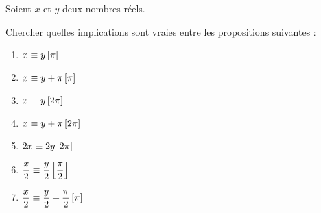 \begin{exo}
Soient \(x\) et \(y\) deux nombres réels.

Chercher quelles implications sont vraies entre les propositions suivantes :

\begin{enumerate}
\item \(x\equiv y\left[\pi\right]\) \\

\item \(x\equiv y+\pi\left[\pi\right]\) \\

\item \(x\equiv y\left[2\pi\right]\) \\

\item \(x\equiv y+\pi\left[2\pi\right]\) \\

\item \(2x\equiv 2y\left[2\pi\right]\) \\

\item \(\dfrac{x}{2}\equiv\dfrac{y}{2}\left[\dfrac{\pi}{2}\right]\) \\

\item \(\dfrac{x}{2}\equiv\dfrac{y}{2}+\dfrac{\pi}{2}\left[\pi\right]\)
\end{enumerate}
\end{exo}

\begin{corr}
\end{corr}